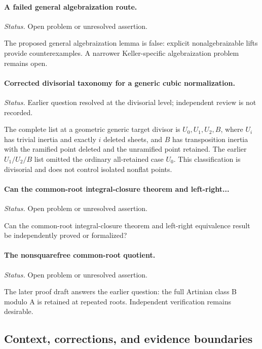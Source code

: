 \label{supp-note-01-037}
\paragraph{A failed general algebraization route.}
\emph{Status.} Open problem or unresolved assertion.

The proposed general algebraization lemma is false: explicit nonalgebraizable lifts provide counterexamples.  A narrower Keller-specific algebraization problem remains open.

\label{supp-note-01-038}
\paragraph{Corrected divisorial taxonomy for a generic cubic normalization.}
\emph{Status.} Earlier question resolved at the divisorial level; independent
review is not recorded.

The complete list at a geometric generic target divisor is
\(U_0,U_1,U_2,B\), where \(U_i\) has trivial inertia and exactly \(i\)
deleted sheets, and \(B\) has transposition inertia with the ramified point
deleted and the unramified point retained.  The earlier \(U_1/U_2/B\) list
omitted the ordinary all-retained case \(U_0\).  This classification is
divisorial and does not control isolated nonflat points.

\label{supp-note-01-039}
\paragraph{Can the common-root integral-closure theorem and left-right...}
\emph{Status.} Open problem or unresolved assertion.

Can the common-root integral-closure theorem and left-right equivalence result be independently proved or formalized?

\label{supp-note-01-040}
\paragraph{The nonsquarefree common-root quotient.}
\emph{Status.} Open problem or unresolved assertion.

The later proof draft answers the earlier question: the full Artinian class B modulo A is retained at repeated roots.  Independent verification remains desirable.

\subsection{Context, corrections, and evidence boundaries}

